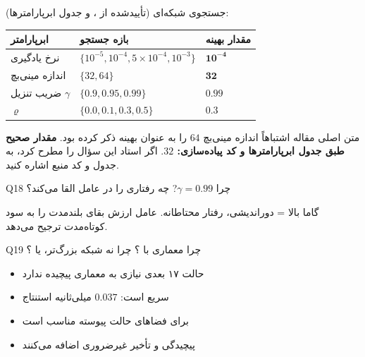 \documentclass[oneside,openany,a4paper,12pt]{article}
\begin{document}
\begin{hintbox}
جستجوی شبکه‌ای (تأییدشده از ،  و جدول ابرپارامترها):

\begin{center}
\begin{tabular}{lll}
\toprule
\textbf{ابرپارامتر} & \textbf{بازه جستجو} & \textbf{مقدار بهینه} \\
\midrule
نرخ یادگیری & $\{10^{-5}, 10^{-4}, 5\times10^{-4}, 10^{-3}\}$ & $\mathbf{10^{-4}}$ \\
اندازه مینی‌بچ & $\{32, 64\}$ & $\mathbf{32}$ \\
ضریب تنزیل $\gamma$ & $\{0.9, 0.95, 0.99\}$ & $\mathbf{0.99}$ \\
$\varrho$ & $\{0.0, 0.1, 0.3, 0.5\}$ & $\mathbf{0.3}$ \\
\bottomrule
\end{tabular}
\end{center}
\end{hintbox}

\begin{warnbox}
متن اصلی مقاله اشتباهاً اندازه مینی‌بچ $64$ را به عنوان بهینه ذکر کرده بود. \textbf{مقدار صحیح طبق جدول ابرپارامترها و کد پیاده‌سازی: $32$}. اگر استاد این سؤال را مطرح کرد، به جدول و کد منبع  اشاره کنید.
\end{warnbox}

\begin{questionbox}{Q18}
چرا $\gamma=0.99$? چه رفتاری را در عامل القا می‌کند؟
\end{questionbox}

\begin{hintbox}
گاما بالا = دوراندیشی، رفتار محتاطانه. عامل ارزش بقای بلندمدت را به سود کوتاه‌مدت ترجیح می‌دهد.
\end{hintbox}

\begin{questionbox}{Q19}
چرا معماری  با ؟ چرا نه شبکه بزرگ‌تر،  یا ؟
\end{questionbox}

\begin{hintbox}
\begin{itemize}
  \item حالت ۱۷ بعدی نیازی به معماری پیچیده ندارد
  \item {} سریع است: $0.037$ میلی‌ثانیه استنتاج
  \item {} برای فضاهای حالت پیوسته مناسب است
  \item {} پیچیدگی و تأخیر غیرضروری اضافه می‌کنند
\end{itemize}
\end{hintbox}
\end{document}

